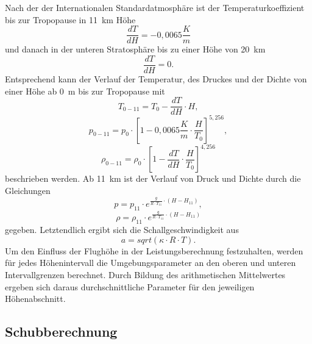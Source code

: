 Nach der der Internationalen Standardatmosphäre ist der Temperaturkoeffizient bis zur Tropopause in \SI{11}{km} Höhe
\begin{equation}
	\frac{dT}{dH} = -0,0065\frac{K}{m}
\end{equation}
und danach in der unteren Stratosphäre bis zu einer Höhe von \SI{20}{km}
\begin{equation}
	\frac{dT}{dH} = 0.
\end{equation}
Entsprechend kann der Verlauf der Temperatur, des Druckes und der Dichte von einer Höhe ab \SI{0}{m} bis zur Tropopause mit
\begin{equation}
	T_{0-11} = T_0 - \frac{dT}{dH}\cdot H,
\end{equation}
\begin{equation}
	p_{0-11} = p_0\cdot [1-0,0065\frac{K}{m}\cdot \frac{H}{T_0}]^{5,256},
\end{equation}
\begin{equation}
	\rho_{0-11} = \rho_0 \cdot [1-\frac{dT}{dH}\cdot \frac{H}{T_0}]^{4,256}
\end{equation}
beschrieben werden. Ab \SI{11}{km} ist der Verlauf von Druck und Dichte durch die Gleichungen
\begin{equation}
	p = p_{11}\cdot e^{\frac{g}{R\cdot T_{11}}\cdot (H-H_{11})},
	\label{eq:druck_strato}
\end{equation} 
\begin{equation}
	\rho = \rho_{11}\cdot e^{\frac{g}{R\cdot T_{11}}\cdot (H-H_{11})}
	\label{eq:dichte_strato}
\end{equation}
gegeben.
Letztendlich ergibt sich die Schallgeschwindigkeit aus 
\begin{equation}
	a = sqrt(\kappa\cdot R\cdot T).
\end{equation}
Um den Einfluss der Flughöhe in der Leistungsberechnung festzuhalten, werden für jedes Höhenintervall die Umgebungsparameter an den oberen und unteren Intervallgrenzen berechnet. Durch Bildung des arithmetischen Mittelwertes ergeben sich daraus durchschnittliche Parameter für den jeweiligen Höhenabschnitt.  

\subsection{Schubberechnung}

